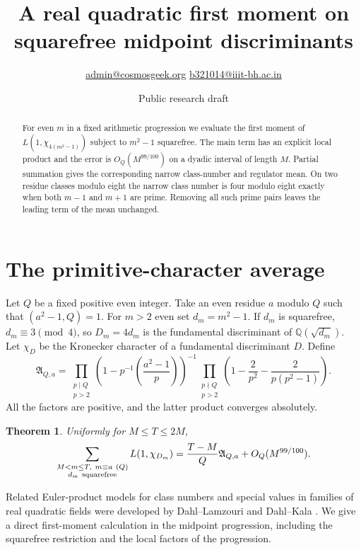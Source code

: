 \documentclass[11pt]{article}
\title{A real quadratic first moment on squarefree midpoint discriminants}
\author{\small\href{mailto:admin@cosmosgeek.org}{admin@cosmosgeek.org}\qquad
\href{mailto:b321014@iiit-bh.ac.in}{b321014@iiit-bh.ac.in}}
\date{Public research draft}
\newtheorem{theorem}{Theorem}
\newcommand{\leg}[2]{\left(\frac{#1}{#2}\right)}
\begin{document}
\maketitle
\begin{abstract}
For even $m$ in a fixed arithmetic progression we evaluate the first
moment of $L(1,\chi_{4(m^2-1)})$ subject to $m^2-1$ squarefree.
The main term has an explicit local product and the error is
$O_Q(M^{99/100})$ on a dyadic interval of length $M$. Partial summation
gives the corresponding narrow class-number and regulator mean.
On two residue classes modulo eight the narrow class number is four
modulo eight exactly when both $m-1$ and $m+1$ are prime. Removing all
such prime pairs leaves the leading term of the mean unchanged.
\end{abstract}

\section{The primitive-character average}
Let $Q$ be a fixed positive even integer. Take an even residue $a$
modulo $Q$ such that $(a^2-1,Q)=1$. For $m>2$ even set $d_m=m^2-1$.
If $d_m$ is squarefree, $d_m\equiv3\pmod4$, so $D_m=4d_m$
is the fundamental discriminant of $\mathbb Q(\sqrt{d_m})$.
Let $\chi_D$ be the Kronecker character of a fundamental discriminant
$D$. Define
\[
\mathfrak A_{Q,a}=
\prod_{\substack{p\mid Q\\ p>2}}
 \left(1-p^{-1}\leg{a^2-1}{p}\right)^{-1}
\prod_{\substack{p\nmid Q\\p>2}}
 \left(1-\frac{2}{p^2}-\frac{2}{p(p^2-1)}\right).
\]
All the factors are positive, and the latter product converges
absolutely.
\begin{theorem}\label{mean}
Uniformly for $M\le T\le2M$,
\[
 \sum_{\substack{M<m\le T,\ m\equiv a\ (Q)\\ d_m\ {\rm squarefree}}}
 L(1,\chi_{D_m})
 =\frac{T-M}{Q}\mathfrak A_{Q,a}+O_Q(M^{99/100}).
\]
\end{theorem}
Related Euler-product models for class numbers and special values in
families of real quadratic fields were developed by Dahl--Lamzouri
and Dahl--Kala \cite{DL,DK}. We give a direct first-moment calculation
in the midpoint progression, including the squarefree restriction and
the local factors of the progression.
\end{document}
